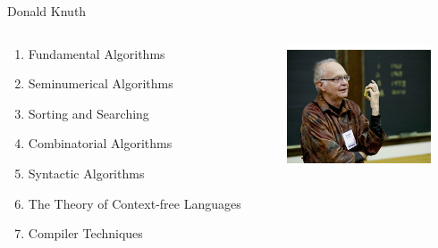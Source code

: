 \documentclass[10pt]{beamer}
\begin{document}
\begin{frame}{Donald Knuth}
    \begin{columns}
        \begin{column}{0.6\textwidth}
            \begin{enumerate}
                \item Fundamental Algorithms
                \item Seminumerical Algorithms
                \item Sorting and Searching
                \item Combinatorial Algorithms
                \item Syntactic Algorithms
                \item The Theory of Context-free Languages
                \item Compiler Techniques
            \end{enumerate}
        \end{column}
        \begin{column}{0.4\textwidth}  %
                \begin{center}
					\includegraphics[height=3.5cm]{images/knuth.jpg}
                \end{center}
        \end{column}
    \end{columns}
\end{frame}
\end{document}
